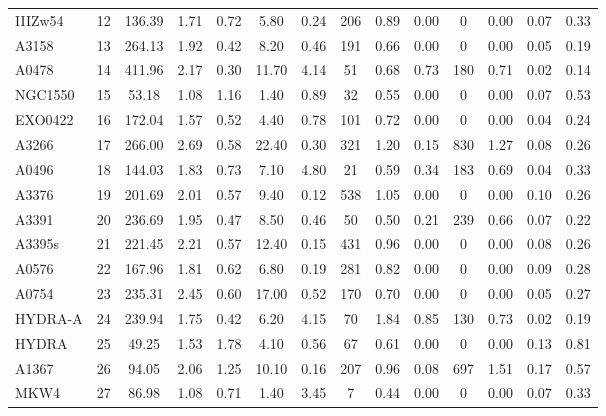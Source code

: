 \documentclass[10pt,aps,pra,reprint,amsmath,amsfonts,amssymb,showpacs,nofootinbib,floatfix]{revtex4-1}
\newcommand{\vst}{\vspace{-0.14mm}}
\begin{document}
\begin{table}
\begin{minipage}{2.0\columnwidth}
\begin{tabular}{l  c c c c c c c c c c c c c}
IIIZw54  &  12 & 136.39 &   1.71 &   0.72 &   5.80 &   0.24 & 206 &   0.89 &   0.00 &    0 &   0.00 &   0.07 &   0.33 \vst \\
A3158    &  13 & 264.13 &   1.92 &   0.42 &   8.20 &   0.46 & 191 &   0.66 &   0.00 &    0 &   0.00 &   0.05 &   0.19 \vst \\
A0478    &  14 & 411.96 &   2.17 &   0.30 &  11.70 &   4.14 &  51 &   0.68 &   0.73 &  180 &   0.71 &   0.02 &   0.14 \vst \\
NGC1550  &  15 &  53.18 &   1.08 &   1.16 &   1.40 &   0.89 &  32 &   0.55 &   0.00 &    0 &   0.00 &   0.07 &   0.53 \vst \\
EXO0422  &  16 & 172.04 &   1.57 &   0.52 &   4.40 &   0.78 & 101 &   0.72 &   0.00 &    0 &   0.00 &   0.04 &   0.24 \vst \\
A3266    &  17 & 266.00 &   2.69 &   0.58 &  22.40 &   0.30 & 321 &   1.20 &   0.15 &  830 &   1.27 &   0.08 &   0.26 \vst \\
A0496    &  18 & 144.03 &   1.83 &   0.73 &   7.10 &   4.80 &  21 &   0.59 &   0.34 &  183 &   0.69 &   0.04 &   0.33 \vst \\
A3376    &  19 & 201.69 &   2.01 &   0.57 &   9.40 &   0.12 & 538 &   1.05 &   0.00 &    0 &   0.00 &   0.10 &   0.26 \vst \\
A3391    &  20 & 236.69 &   1.95 &   0.47 &   8.50 &   0.46 &  50 &   0.50 &   0.21 &  239 &   0.66 &   0.07 &   0.22 \vst \\
A3395s   &  21 & 221.45 &   2.21 &   0.57 &  12.40 &   0.15 & 431 &   0.96 &   0.00 &    0 &   0.00 &   0.08 &   0.26 \vst \\
A0576    &  22 & 167.96 &   1.81 &   0.62 &   6.80 &   0.19 & 281 &   0.82 &   0.00 &    0 &   0.00 &   0.09 &   0.28 \vst \\
A0754    &  23 & 235.31 &   2.45 &   0.60 &  17.00 &   0.52 & 170 &   0.70 &   0.00 &    0 &   0.00 &   0.05 &   0.27 \vst \\
HYDRA-A  &  24 & 239.94 &   1.75 &   0.42 &   6.20 &   4.15 &  70 &   1.84 &   0.85 &  130 &   0.73 &   0.02 &   0.19 \vst \\
HYDRA    &  25 &  49.25 &   1.53 &   1.78 &   4.10 &   0.56 &  67 &   0.61 &   0.00 &    0 &   0.00 &   0.13 &   0.81 \vst \\
A1367    &  26 &  94.05 &   2.06 &   1.25 &  10.10 &   0.16 & 207 &   0.96 &   0.08 &  697 &   1.51 &   0.17 &   0.57 \vst \\
MKW4     &  27 &  86.98 &   1.08 &   0.71 &   1.40 &   3.45 &   7 &   0.44 &   0.00 &    0 &   0.00 &   0.07 &   0.33 \vst \\

\end{tabular}
\end{minipage}
\end{table}
\end{document}
